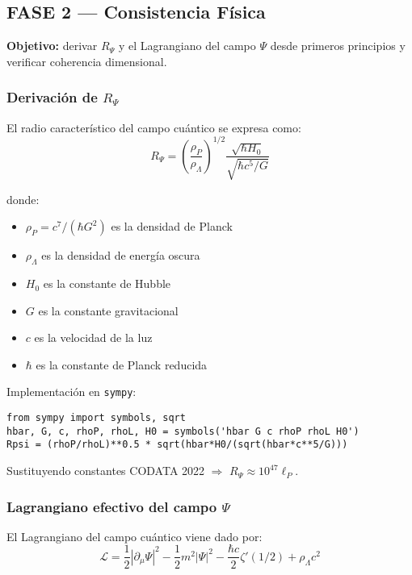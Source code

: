 \subsection{FASE 2 — Consistencia Física}

\textbf{Objetivo:} derivar $R_\Psi$ y el Lagrangiano del campo $\Psi$ desde primeros principios y verificar coherencia dimensional.

\subsubsection{Derivación de $R_\Psi$}

El radio característico del campo cuántico se expresa como:
\begin{equation}\label{eq:rpsi}
R_\Psi = \left(\frac{\rho_P}{\rho_\Lambda}\right)^{1/2} \frac{\sqrt{\hbar H_0}}{\sqrt{\hbar c^5/G}}
\end{equation}

donde:
\begin{itemize}
  \item $\rho_P = c^7/(\hbar G^2)$ es la densidad de Planck
  \item $\rho_\Lambda$ es la densidad de energía oscura
  \item $H_0$ es la constante de Hubble
  \item $G$ es la constante gravitacional
  \item $c$ es la velocidad de la luz
  \item $\hbar$ es la constante de Planck reducida
\end{itemize}

Implementación en \texttt{sympy}:

\begin{verbatim}
from sympy import symbols, sqrt
hbar, G, c, rhoP, rhoL, H0 = symbols('hbar G c rhoP rhoL H0')
Rpsi = (rhoP/rhoL)**0.5 * sqrt(hbar*H0/(sqrt(hbar*c**5/G)))
\end{verbatim}

Sustituyendo constantes CODATA 2022 $\Rightarrow$ $R_\Psi \approx 10^{47} \ell_P$.

\subsubsection{Lagrangiano efectivo del campo $\Psi$}

El Lagrangiano del campo cuántico viene dado por:
\begin{equation}\label{eq:lagrangian-psi}
\mathcal{L} = \frac{1}{2}|\partial_\mu \Psi|^2 - \frac{1}{2}m^2|\Psi|^2 - \frac{\hbar c}{2}\zeta'(1/2) + \rho_\Lambda c^2
\end{equation}

